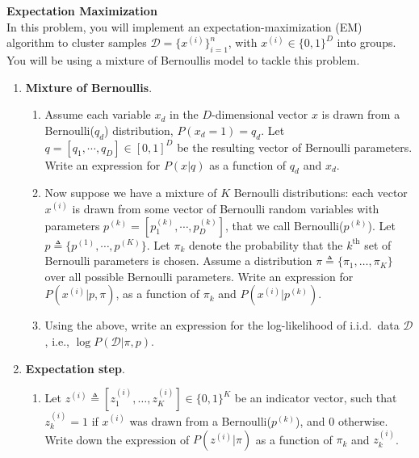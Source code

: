 \begin{Q}
\textbf{\Large  Expectation Maximization}\\
In this problem, you will implement an expectation-maximization (EM) algorithm to cluster samples $\mathcal{D}=\{x^{(i)}\}_{i=1}^{n}$, with $x^{(i)} \in \{ 0,1 \}^{D}$ into groups. You will be using a mixture of Bernoullis model to tackle this problem. 


\begin{enumerate}

\item \textbf{Mixture of Bernoullis}. 

\begin{enumerate}
\item Assume each variable $x_d$ in the $D$-dimensional vector $x$ is drawn from a Bernoulli($q_{d}$) distribution, $P(x_{d}=1)=q_{d}$. Let $q=[q_{1}, \cdots, q_{D}] \in [0,1]^{D}$ be the resulting vector of Bernoulli parameters. Write an expression for $P(x|q)$ as a function of $q_d$ and $x_{d}$.

\item Now suppose we have a mixture of $K$ Bernoulli distributions: each vector $x^{(i)}$ is drawn from some vector of Bernoulli random variables with parameters $p^{(k)}=[p_{1}^{(k)}, \cdots, p_{D}^{(k)}]$, that we call Bernoulli($p^{(k)}$). Let $p \triangleq \{p^{(1)}, \cdots , p^{(K)}\}$. 
Let $\pi_{k}$ denote the probability that the $k^{\text{th}}$ set of Bernoulli parameters is chosen.
Assume a distribution $\pi \triangleq \{ \pi_1, \dots, \pi_K \}$ over all possible Bernoulli parameters.
Write an expression for $P(x^{(i)}|p, \pi)$, as a function of $\pi_{k}$ and $P(x^{(i)}|p^{(k)})$.

\item Using the above, write an expression for the log-likelihood of i.i.d.\ data $\mathcal{D}$, i.e., $\log P(\mathcal{D}|\pi, p)$.

\end{enumerate}

\item  \textbf{Expectation step}. 

\begin{enumerate}
\item Let $z^{(i)} \triangleq [ z_1^{(i)}, \dots, z_K^{(i)}  ] \in \{ 0,1\}^{K}$ be an indicator vector, such that $z_{k}^{(i)}=1$ if $x^{(i)}$ was drawn from a Bernoulli($p^{(k)}$), and 0 otherwise.  
Write down the expression of $P(z^{(i)}|\pi)$ as a function of $\pi_{k}$ and ${z_{k}^{(i)}}$. 


\end{enumerate}
\end{enumerate}
\end{Q}
